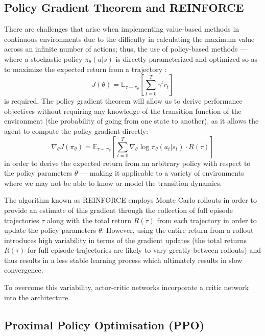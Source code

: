 \subsection{Policy Gradient Theorem and REINFORCE}

There are challenges that arise when implementing value-based methods in continuous environments due to the difficulty in calculating the maximum value across an infinite number of actions; thus, the use of policy-based methods — where a stochastic policy $\pi_\theta(a|s)$ is directly parameterized and optimized so as to maximize the expected return from a trajectory \citep{sutton1999policy}:
\begin{equation}
    J(\theta) = \mathbb{E}_{\tau \sim \pi_\theta} \left[ \sum_{t=0}^{T} \gamma^t r_t \right]
\end{equation}
is required. The policy gradient theorem will allow us to derive performance objectives without requiring any knowledge of the transition function of the environment (the probability of going from one state to another), as it allows the agent to compute the policy gradient directly:
\begin{equation}
    \nabla_\theta J(\pi_\theta) = \mathbb{E}_{\tau \sim \pi_\theta} \left[ \sum_{t=0}^{T} \nabla_\theta \log \pi_\theta(a_t | s_t) \cdot R(\tau) \right]
\end{equation}
in order to derive the expected return from an arbitrary policy with respect to the policy parameters $\theta$ — making it applicable to a variety of environments where we may not be able to know or model the transition dynamics.

The algorithm known as REINFORCE \citep{williams1992reinforce} employs Monte Carlo rollouts in order to provide an estimate of this gradient through the collection of full episode trajectories $\tau$ along with the total return $R(\tau)$ from each trajectory in order to update the policy parameters $\theta$. However, using the entire return from a rollout introduces high variability in terms of the gradient updates (the total returns $R(\tau)$ for full episode trajectories are likely to vary greatly between rollouts) and thus results in a less stable learning process which ultimately results in slow convergence.

To overcome this variability, actor-critic networks incorporate a critic network into the architecture.

\subsection{Proximal Policy Optimisation (PPO)}

